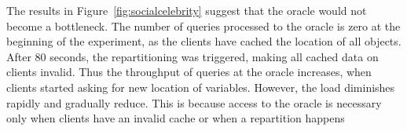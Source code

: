 The results in Figure~\ref{fig:socialcelebrity} suggest that the oracle would not become a bottleneck.
The number of queries processed to the oracle is zero at the
beginning of the experiment, as the clients have cached the location of all objects.
After 80 seconds, the repartitioning was triggered, making all cached data on clients invalid.
Thus the throughput of queries at the oracle increases, when clients started asking for new location of variables.
However, the load diminishes rapidly and gradually reduce. This is because access to the oracle is necessary only
when clients have an invalid cache or when a repartition happens








